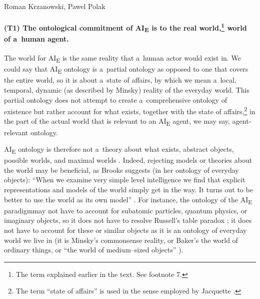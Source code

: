 \begin{artengenv2auth}{Roman Krzanowski, Pawel Polak}
\paragraph[(T1) The ontological commitment]{(T1) The ontological commitment of AI\textsubscript{E} is to the real world,\footnote{The term explained earlier in the text. See footnote 7.} world of a~human agent.}%
 The world for AI\textsubscript{E} is the same reality that a~human actor would exist in. We could say that AI\textsubscript{E} ontology is a~partial ontology as opposed to one that covers the entire world, so it is about a~state of affairs, by which we mean a~local, temporal, dynamic (as described by Minsky) reality of the everyday world. This partial ontology does not attempt to create a~comprehensive ontology of existence but rather account for what exists, together with the state of affairs,\footnote{The term ``state of affairs'' is used in the sense employed by Jacquette
\parencite*[][]{jacquette_ontology_2002}.%
} in the part of the actual world that is relevant to an AI\textsubscript{E} agent, we may say, agent-relevant ontology.

AI\textsubscript{E} ontology is therefore not a~theory about what exists, abstract objects, possible worlds, and maximal worlds
\parencites[e.g.,][]{mulligan_worlds_1992}[][]{textor_states_2021}. %
 Indeed, rejecting models or theories about the world may be beneficial, as Brooks suggests (in her ontology of everyday objects): ``When we examine very simple level intelligence we find that explicit representations and models of the world simply get in the way. It turns out to be better to use the world as its own model'' 
\parencite[][]{brooks_intelligence_1991}. %
 For instance, the ontology of the AI\textsubscript{E} paradigmmay not have to account for subatomic particles, quantum physics, or imaginary objects, so it does not have to resolve Russell's table paradox 
\parencite[][]{russell_problems_1912}; %
 it does not have to account for these or similar objects as it is an ontology of everyday world we live in (it is Minsky's commonsense reality, or Baker's the world of ordinary things, or ``the world of medium–sized objects'' 
\parencite[][p.18]{baker_metaphysics_2007}%
).


\end{artengenv2auth}
